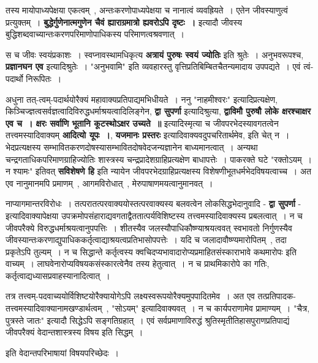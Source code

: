 	तस्य मायोपाध्यपेक्षया एकत्वम्~, अन्तःकरणोपाध्यपेक्षया च नानात्वं व्यवह्रियते~। एतेन जीवस्याणुत्वं प्रत्युक्तम्~। {\bfseries बुद्धेर्गुणेनात्मगुणेन चैवं ह्याराग्रमात्रो ह्यवरोऽपि दृष्टः~।} इत्यादौ जीवस्य बुद्धिशब्दवाच्यान्तःकरणपरिमाणोपाधिकस्य परिमाणत्वश्रवणात्~।\par
	स च जीवः स्वयंप्रकाशः~। स्वप्नावस्थामधिकृत्य {\bfseries अत्रायं पुरुषः स्वयं ज्योतिः} इति श्रुतेः~। अनुभवरूपश्च, {\bfseries प्रज्ञानघन एव} इत्यादिश्रुतेः~। "अनुभवामि" इति व्यवहारस्तु वृत्तिप्रतिबिम्बितचैतन्यमादाय उपपद्यते~। एवं त्वं-पदार्थो निरूपितः~।\par
	अधुना तत्-त्वम्-पदार्थयोरैक्यं महावाक्यप्रतिपाद्यमभिधीयते~। ननु "नाहमीश्वरः" इत्यादिप्रत्यक्षेण, किञ्चिज्ज्ञत्वसर्वज्ञत्वादिविरुद्धधर्माश्रयत्वादिलिङ्गेन, {\bfseries द्वा सुपर्णा} इत्यादिश्रुत्या, {\bfseries द्वाविमौ पुरुषौ लोके क्षरश्चाक्षर एव च~। क्षरः सर्वाणि भूतानि कूटस्थोऽक्षर उच्यते~॥} इत्यादिस्मृत्या च जीवपरभेदस्यावगतत्वेन तत्त्वमस्यादिवाक्यम् {\bfseries आदित्यो यूपः~।}, {\bfseries यजमानः प्रस्तरः} इत्यादिवाक्यवदुपचरितार्थमेव, इति चेत् न~। भेदप्रत्यक्षस्य सम्भावितकरणदोषस्यासम्भावितदोषवेदजन्यज्ञानेन बाध्यमानत्वात्~। अन्यथा चन्द्रगताधिकपरिमाणग्राहिज्योतिः शास्त्रस्य चन्द्रप्रादेशग्राहिप्रत्यक्षेण बाधापत्तेः~। पाकरक्ते घटे "रक्तोऽयम्~। न श्यामः" इतिवत् {\bfseries सविशेषणे हि} इति न्यायेन जीवपरभेदग्राहिप्रत्यक्षस्य विशेषणीभूतधर्मभेदविषयत्वाच्च~। अत एव नानुमानमपि प्रमाणम्~, आगमविरोधात्~, मेरुपाषाणमयत्वानुमानवत्~।\par
	नाप्यागमान्तरविरोधः~। तत्परातत्परवाक्ययोस्तत्परवाक्यस्य बलवत्वेन लोकसिद्धभेदानुवादि - {\bfseries द्वा सुपर्णा} - इत्यादिवाक्यापेक्षया उपक्रमोपसंहाराद्यवगताद्वैततात्पर्यविशिष्टस्य तत्त्वमस्यादिवाक्यस्य प्रबलत्वात्~। न च जीवपरैक्ये विरुद्धधर्माश्रयत्वानुपपत्तिः~। शीतस्यैव जलस्यौपाधिकौष्ण्याश्रयत्ववत् स्वभावतो निर्गुणस्यैव जीवस्यान्तःकरणाद्युपाधिककर्तृत्वाद्याश्रयत्वप्रतिभासोपपत्तेः~। यदि च जलादावौष्ण्यमारोपितम्~, तदा प्रकृतेऽपि तुल्यम्~। न च सिद्धान्ते कर्तृत्वस्य क्वचिदप्यभावादारोप्यप्रमाहितसंस्काराभावे कथमारोपः इति वाच्यम्~। लाघवेनारोप्यविषयकसंस्कारत्वेनैव तस्य हेतुत्वात्~। न च प्राथमिकारोपे का गतिः, कर्तृत्वाद्यध्यासप्रवाहस्यानादित्वात्~।\par
	तत्र तत्त्वम्-पदवाच्ययोर्विशिष्टयोरैक्यायोगेऽपि लक्ष्यस्वरूपयोरैक्यमुपपादितमेव~। अत एव तत्प्रतिपादक-तत्त्वमस्यादिवाक्यानामखण्डार्थत्वम्~, "सोऽयम्" इत्यादिवाक्यवत्~। न च कार्यपराणामेव प्रामाण्यम्~। "चैत्र, पुत्रस्ते जातः" इत्यादौ सिद्धेऽपि सङ्गतिग्रहात्~। एवं सर्वप्रमाणाविरुद्धं श्रुतिस्मृतीतिहासपुराणप्रतिपाद्यं जीवपरैक्यं वेदान्तशास्त्रस्य विषय इति सिद्धम्~।\par
	\begin{center} इति वेदान्तपरिभाषायां विषयपरिच्छेदः~।\end{center} 
